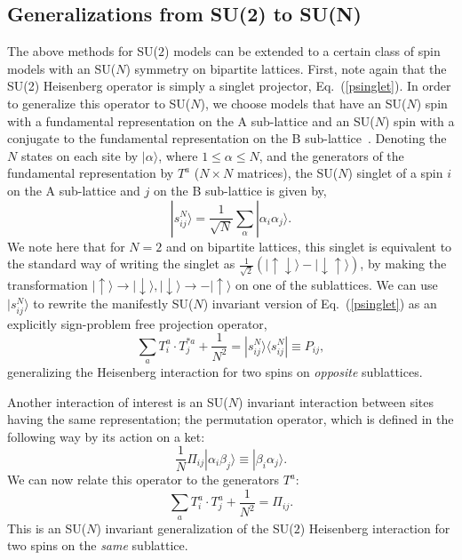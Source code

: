 \documentclass[10pt,pre,aps,twocolumn,showpacs,subscriptaddresses,floatfix]{revtex4}
\begin{document}
\subsection {Generalizations from SU(2) to SU(N)}
\label{ss:su2N}

The above methods for SU($2$) models can be extended to a certain class of spin models with an SU($N$) symmetry on bipartite lattices. First, note again 
that the SU(2) Heisenberg operator is simply a singlet projector, Eq.~(\ref{psinglet}). In order to generalize this operator to SU($N$), we choose models 
that have an SU($N$) spin with a fundamental representation on the A sub-lattice and an SU($N$) spin with a conjugate to the fundamental representation 
on the B sub-lattice~\cite{affleck1985:lgN,Read89}. Denoting the $N$ states on each site by $|\alpha\rangle$, where $1\leq \alpha \leq N$, 
and the generators of the fundamental representation by $T^a$ ($N\times N$ matrices), the SU($N$) singlet of a spin $i$ on the A sub-lattice and $j$ 
on the B sub-lattice is given by, 
\begin{equation}
|s^N_{ij}\rangle = \frac{1}{\sqrt{N}}\sum_\alpha |\alpha_i\alpha_j\rangle. 
\end{equation}
We note here that for $N=2$ and on bipartite lattices, this singlet is equivalent to the standard way of writing the singlet as $\frac{1}{\sqrt{2}}\left (|\uparrow \downarrow\rangle -|\downarrow \uparrow\rangle \right )$, by making the transformation $|\uparrow \rangle\rightarrow |\downarrow\rangle, |\downarrow \rangle\rightarrow -|\uparrow\rangle$ on one of the sublattices. We can use  $|s^N_{ij}\rangle$ to rewrite the manifestly SU($N$) invariant version of Eq.~(\ref{psinglet}) as an explicitly sign-problem 
free projection operator,
\begin{equation}
\sum_a T^a_i \cdot
T^{*a}_j + \frac{1}{N^2} = |s^N_{ij}\rangle \langle s^N_{ij}|\equiv P_{ij},
\end{equation}
generalizing the Heisenberg interaction for two spins on {\em opposite} sublattices. 

Another interaction of interest is an SU($N$) invariant interaction between sites having the same representation; the permutation operator, 
which is defined in the following way by its action on a ket:
\begin{equation}
\frac{1}{N}\Pi_{ij}|\alpha_i\beta_j\rangle \equiv |\beta_i\alpha_j\rangle. 
\label{pija}
\end{equation}
We can now relate this operator to the generators $T^a$:
\begin{equation}
\sum_a T^a_i \cdot
T^{a}_j +\frac{1}{N^2} =\Pi_{ij}.
\label{pijb}
\end{equation}
This is an SU($N$) invariant generalization of the SU($2$) Heisenberg interaction for two spins on the {\em same} sublattice.
\end{document}

